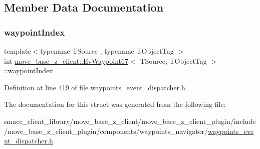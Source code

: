 \subsection{Member Data Documentation}
\mbox{\label{structmove__base__z__client_1_1EvWaypoint67_ad653cf334d6e69860094a86b54cfd781}} 
\subsubsection{\texorpdfstring{waypoint\+Index}{waypointIndex}}
{\footnotesize\ttfamily template$<$typename T\+Source , typename T\+Object\+Tag $>$ \\
int \hyperlink{structmove__base__z__client_1_1EvWaypoint67}{move\+\_\+base\+\_\+z\+\_\+client\+::\+Ev\+Waypoint67}$<$ T\+Source, T\+Object\+Tag $>$\+::waypoint\+Index}



Definition at line 419 of file waypoints\+\_\+event\+\_\+dispatcher.\+h.



The documentation for this struct was generated from the following file\+:\begin{DoxyCompactItemize}
\item 
smacc\+\_\+client\+\_\+library/move\+\_\+base\+\_\+z\+\_\+client/move\+\_\+base\+\_\+z\+\_\+client\+\_\+plugin/include/move\+\_\+base\+\_\+z\+\_\+client\+\_\+plugin/components/waypoints\+\_\+navigator/\hyperlink{waypoints__event__dispatcher_8h}{waypoints\+\_\+event\+\_\+dispatcher.\+h}\end{DoxyCompactItemize}
